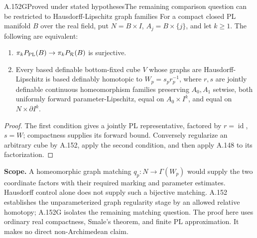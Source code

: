 \begin{saresult}{A.152G}{Proved under stated hypotheses}{The remaining comparison question can be restricted to Hausdorff-Lipschitz graph families}
For a compact closed PL manifold \(B\) over the real field, put \(N=B\times I\),
\(A_j=B\times\{j\}\), and let \(k\ge1\).
The following are equivalent:
\begin{enumerate}
\item \(\pi_kP_{\rm PL}(B)\to\pi_kP_{\mathcal R}(B)\) is surjective.
\item Every based definable bottom-fixed cube \(V\) whose graphs are
Hausdorff-Lipschitz is based definably homotopic to
\(W_p=s_pr_p^{-1}\), where \(r,s\) are jointly definable continuous
homeomorphism families preserving \(A_0,A_1\) setwise,
both uniformly forward parameter-Lipschitz, equal on \(A_0\times I^k\),
and equal on \(N\times\partial I^k\).
\end{enumerate}
\end{saresult}
\begin{proof}
The first condition gives a jointly PL representative, factored by
\(r=\operatorname{id}\), \(s=W\); compactness supplies its forward
bound. Conversely regularize an arbitrary cube by A.152, apply the
second condition, and then apply A.148 to its factorization.
\end{proof}

\textbf{Scope.}
A homeomorphic graph matching \(q_p:N\to\Gamma(W_p)\) would supply
the two coordinate factors with their required marking and parameter
estimates. Hausdorff control alone does not supply such a bijective
matching. A.152 establishes the unparameterized graph regularity
stage by an allowed relative homotopy; A.152G isolates the remaining
matching question. The proof here uses ordinary real compactness,
Smale's theorem, and finite PL approximation. It makes no direct
non-Archimedean claim.

